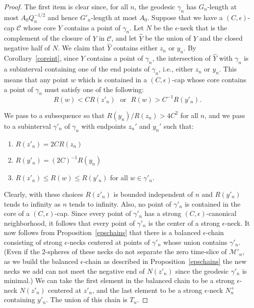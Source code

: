 \begin{proof}
The first item is clear since, for all $n$, the geodesic $\gamma_n$
has $G_n$-length at most $A_0Q_n^{-1/2}$ and hence $G'_n$-length at
most $A_0$. Suppose that we have a $(C,\epsilon)$-cap ${\mathcal C}$
whose core $Y$ contains a point of $\gamma_n$. Let $N$ be the
$\epsilon$-neck that is the complement of the closure of $Y$ in
${\mathcal C}$, and let $\widehat Y$ be the union of $Y$ and the
closed negative half of $N$. We claim that $\widehat Y$ contains
either $z_n$ or $y_n$. By Corollary~\ref{coreint}, since $Y$
contains a point of $\gamma_n$, the intersection of $\widehat Y$
with $\gamma_n$ is a subinterval containing one of the end points of
$\gamma_n$, i.e., either $z_n$ or $y_n$. This means that any point
$w$  which is contained in a $(C,\epsilon)$-cap whose core contains
a point of $\gamma_n$ must satisfy one of the following:
$$R(w)< CR(z'_n)\ \ \ \text{or}\ \ \ R(w)> C^{-1}R(y'_n).$$

We pass to a subsequence so that $R(y_n)/R(z_n)>4C^2$ for all $n$,
and we pass to a subinterval $\gamma'_n$ of $\gamma_n$ with
endpoints $z_n'$ and $y_n'$ such that:
\begin{enumerate}
\item[(1)] $R(z'_n)=2CR(z_n)$
\item[(2)] $R(y'_n)=(2C)^{-1}R(y_n)$
\item[(3)] $R(z'_n)\le R(w)\le R(y'_n)$ for all $w\in \gamma'_n$.
\end{enumerate}
Clearly, with these choices $R(z'_n)$ is bounded independent of $n$
and $R(y'_n)$ tends to infinity as $n$ tends to infinity. Also, no
point of $\gamma'_n$ is contained in the core of a
$(C,\epsilon)$-cap. Since every point of $\gamma'_n$ has a strong
$(C,\epsilon)$-canonical neighborhood, it follows that every point
of $\gamma'_n$ is the center of a strong $\epsilon$-neck. It now
follows from Proposition~\ref{epschains} that there is a balanced
$\epsilon$-chain consisting of strong $\epsilon$-necks centered at
points of $\gamma'_n$ whose union contains $\gamma'_n$. (Even if the
$2$-spheres of these necks do not separate the zero time-slice of
${\mathcal M}'_n$, as we build the balanced $\epsilon$-chain as
described in Proposition~\ref{epschains} the new necks we add can
not meet the negative end of $N(z'_n)$ since the geodesic
$\gamma'_n$ is minimal.) We can take the first element in the
balanced chain to be a strong $\epsilon$-neck $N(z'_n)$ centered at
$z'_n$, and the last element to be a strong $\epsilon$-neck $N^+_n$
containing $y'_n$. The union of this chain is $T_n$.


\end{proof}
